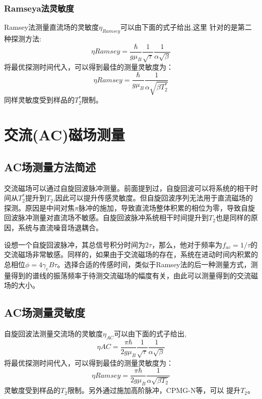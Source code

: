 \subsubsection{Ramseya法灵敏度}
Ramsey法测量直流场的灵敏度$\eta_{Ramsey}$可以由下面的式子给出,这里 针对的是第二种探测方法:
\begin{equation}
    \eta{Ramsey}=\frac{\hbar}{g \mu_{B}}\frac{1}{\sqrt{\tau}}\frac{1}{\alpha \sqrt{\beta}}
\end{equation}
将最优探测时间代入，可以得到最佳的测量灵敏度为：
\begin{equation}
    \eta{Ramsey}=\frac{\hbar}{g \mu_{B}}\frac{1}{\alpha \sqrt{\beta T_2^*}}
\end{equation}
同样灵敏度受到样品的$T_2^*$限制。

\section{交流(AC)磁场测量}
\subsection{AC场测量方法简述}
交流磁场可以通过自旋回波脉冲测量。前面提到过，自旋回波可以将系统的相干时间从$T_2^*$提升到$T_2$,因此可以提升传感灵敏度。但自旋回波序列无法用于直流磁场的探测。原因是中间对焦$\pi$脉冲的施加，导致直流场整体积累的相位为零，导致自旋回波脉冲测量对直流场不敏感。自旋回波脉冲系统相干时间提升到$T_2$也是同样的原因，系统与直流噪音场退耦合。

设想一个自旋回波脉冲，其总信号积分时间为2$\tau$，那么，他对于频率为$f_{ac}=1/\tau$的交流磁场非常敏感。同样的，如果由于交流磁场的存在，系统在进动时间内积累的总相位$\phi=4\gamma_{e} B \tau$。选择合适的传感时间，类似于Ramsey法的后一种测量方式，测量得到的谱线的振荡频率于待测交流磁场的幅度有关，由此可以测量得到的交流磁场的大小。
\subsection{AC场测量灵敏度}
自旋回波法测量交流场的灵敏度$\eta_{AC}$可以由下面的式子给出,
\begin{equation}
    \eta{AC}=\frac{\pi \hbar}{2 g \mu_{B}}\frac{1}{\sqrt{\tau}}\frac{1}{\alpha \sqrt{\beta}}
\end{equation}
将最优探测时间代入，可以得到最佳的测量灵敏度为：
\begin{equation}
    \eta{Ramsey}=\frac{\pi \hbar}{2 g \mu_{B}}\frac{1}{\alpha \sqrt{\beta T_2}}
\end{equation}
灵敏度受到样品的$T_2$限制。另外通过施加高阶脉冲，CPMG-N等，可以 提升$T_2$。

